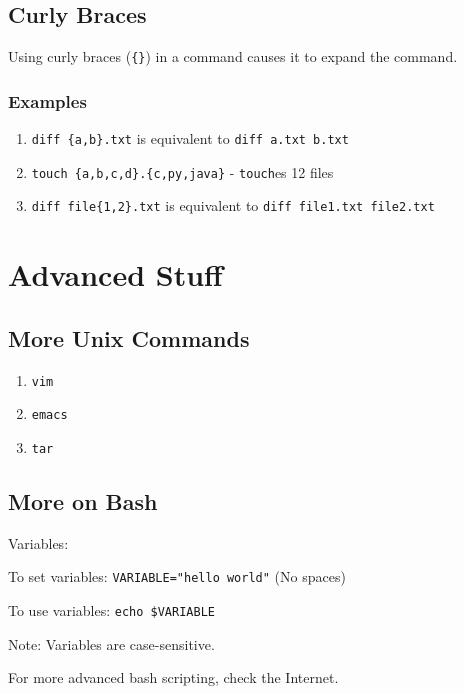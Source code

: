\documentclass[12pt]{article}
\begin{document}
\subsection{Curly Braces}
Using curly braces (\texttt{\{\}}) in a command causes it to expand the command.

\subsubsection{Examples}
\begin{enumerate}
\item \texttt{diff \{a,b\}.txt} is equivalent to \texttt{diff a.txt b.txt}
\item \texttt{touch \{a,b,c,d\}.\{c,py,java\}} - \texttt{touch}es 12 files
\item \texttt{diff file\{1,2\}.txt} is equivalent to \texttt{diff file1.txt file2.txt}
\end{enumerate}

\newpage
\section{Advanced Stuff}
\subsection{More Unix Commands}
\begin{enumerate}

\item{\texttt{vim}}

\item{\texttt{emacs}}

\item{\texttt{tar}}
\end{enumerate}

\subsection{More on Bash}
Variables:

To set variables:
\texttt{VARIABLE="hello world"} (No spaces)

To use variables:
\texttt{echo \$VARIABLE}

Note: Variables are case-sensitive.

For more advanced bash scripting, check the Internet.
\end{document}
